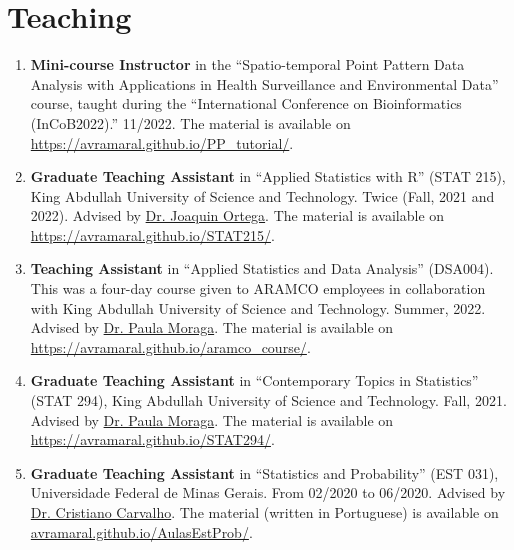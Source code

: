 \documentclass[10pt, ]{article}
\begin{document}
	\noindent\makebox[\linewidth]{\rule{\paperwidth}{0.5pt}}
	
	\vspace{-12pt}
	\section*{Teaching} \vspace{-5pt}
	
	\begin{enumerate}[noitemsep, topsep=0pt]
		\item \textbf{Mini-course Instructor} in the ``Spatio-temporal Point Pattern Data Analysis with Applications in Health Surveillance and Environmental Data'' course, taught during the ``International Conference on Bioinformatics (InCoB2022).'' 11/2022. The material is available on  \href{https://avramaral.github.io/PP_tutorial/}{\url{https://avramaral.github.io/PP_tutorial/}}.
		
		\item \textbf{Graduate Teaching Assistant} in ``Applied Statistics with R'' (STAT 215), King Abdullah University of Science and Technology. Twice (Fall, 2021 and 2022). Advised by \href{https://cemse.kaust.edu.sa/people/person/joaquin-ortega-sanchez}{Dr. Joaquin Ortega}. The material is available on \href{https://avramaral.github.io/STAT215/}{\url{https://avramaral.github.io/STAT215/}}.
		
		\item \textbf{Teaching Assistant} in ``Applied Statistics and Data Analysis'' (DSA004). This was a four-day course given to ARAMCO employees in collaboration with King Abdullah University of Science and Technology. Summer, 2022. Advised by \href{https://www.paulamoraga.com/}{Dr. Paula Moraga}. The material is available on \href{https://avramaral.github.io/aramco\_course/}{\url{https://avramaral.github.io/aramco\_course/}}.
		
		\item \textbf{Graduate Teaching Assistant} in ``Contemporary Topics in Statistics'' (STAT 294), King Abdullah University of Science and Technology. Fall, 2021. Advised by \href{https://www.paulamoraga.com/}{Dr. Paula Moraga}. The material is available on \href{https://avramaral.github.io/STAT294/}{\url{https://avramaral.github.io/STAT294/}}.
		
		\item \textbf{Graduate Teaching Assistant} in ``Statistics and Probability'' (EST 031), Universidade Federal de Minas Gerais. From 02/2020 to 06/2020. Advised by \href{http://www.est.ufmg.br/~cristianocs/}{Dr. Cristiano Carvalho}. The material (written in Portuguese) is available on \href{https://avramaral.github.io/AulasEstProb/}{\url{avramaral.github.io/AulasEstProb/}}.
	\end{enumerate}
	
\end{document}
